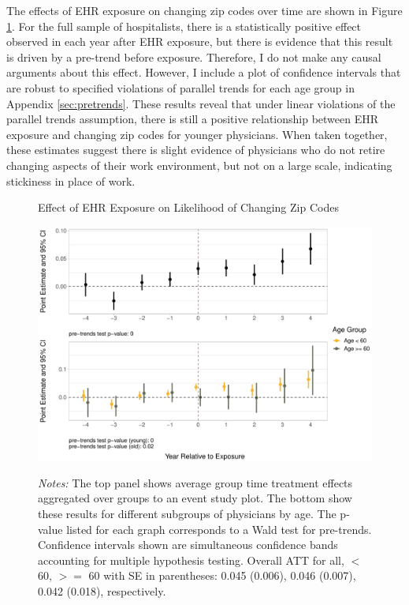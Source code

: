 \documentclass[12pt]{article}
\begin{document}
The effects of EHR exposure on changing zip codes over time are shown in Figure \ref{fig:zip}. For the full sample of hospitalists, there is a statistically positive effect observed in each year after EHR exposure, but there is evidence that this result is driven by a pre-trend before exposure. Therefore, I do not make any causal arguments about this effect. However, I include a plot of confidence intervals that are robust to specified violations of parallel trends for each age group in Appendix \ref{sec:pretrends}. These results reveal that under linear violations of the parallel trends assumption, there is still a positive relationship between EHR exposure and changing zip codes for younger physicians. When taken together, these estimates suggest there is slight evidence of physicians who do not retire changing aspects of their work environment, but not on a large scale, indicating stickiness in place of work. 

\begin{figure}[ht]
    \centering
    \captionsetup{width=.85\linewidth}
    \caption{Effect of EHR Exposure on Likelihood of Changing Zip Codes}
    \includegraphics[scale=.6]{Objects/zip_plot.pdf}
    \label{fig:zip}
    \vspace{2mm}
    \caption*{\footnotesize{\textit{Notes:} The top panel shows average group time treatment effects aggregated over groups to an event study plot. The bottom show these results for different subgroups of physicians by age. The p-value listed for each graph corresponds to a Wald test for pre-trends. Confidence intervals shown are simultaneous confidence bands accounting for multiple hypothesis testing. Overall ATT for all, $<$ 60, $>=$ 60 with SE in parentheses: 0.045 (0.006), 0.046 (0.007), 0.042 (0.018), respectively.}}
\end{figure}
\end{document}
